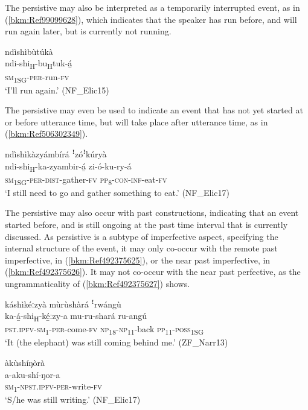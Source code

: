 The persistive may also be interpreted as a temporarily interrupted event, as in (\ref{bkm:Ref99099628}), which indicates that the speaker has run before, and will run again later, but is currently not running.

\ea
\label{bkm:Ref99099628}
\glll ndìshìbùtúkà\\
ndi-shi\textsubscript{H}-bu\textsubscript{H}tuk-á̲\\
\textsc{sm}\textsubscript{1SG}-\textsc{per}-run-\textsc{fv}\\
\glt ‘I’ll run again.’ (NF\_Elic15)
\z

The persistive may even be used to indicate an event that has not yet started at or before utterance time, but will take place after utterance time, as in (\ref{bkm:Ref506302349}).

\ea
\label{bkm:Ref506302349}
ndìshìkàzyámbírá ꜝzóꜝkúryà\\
\gll ndi-shi\textsubscript{H}-ka-zyambir-á̲  zi-ó-ku-ry-á\\
\textsc{sm}\textsubscript{1SG}-\textsc{per}-\textsc{dist}-gather-\textsc{fv}  \textsc{pp}\textsubscript{8}-\textsc{con}-\textsc{inf}-eat\--\textsc{fv}\\
\glt ‘I still need to go and gather something to eat.’ (NF\_Elic17)
\z

The persistive may also occur with past constructions, indicating that an event started before, and is still ongoing at the past time interval that is currently discussed. As persistive is a subtype of imperfective aspect, specifying the internal structure of the event, it may only co-occur with the remote past imperfective, in (\ref{bkm:Ref492375625}), or the near past imperfective, in (\ref{bkm:Ref492375626}). It may not co-occur with the near past perfective, as the ungrammaticality of (\ref{bkm:Ref492375627}) shows.

\ea
\label{bkm:Ref492375625}
káshìkéːzyà mùrùshàrá ꜝrwángù\\
\gll ka-á̲-shi\textsubscript{H}-ké̲ːzy-a      mu-ru-shará    ru-angú\\
\textsc{pst}.\textsc{ipfv}-\textsc{sm}\textsubscript{1}-\textsc{per}-come-\textsc{fv}  \textsc{np}\textsubscript{18}-\textsc{np}\textsubscript{11}-back  \textsc{pp}\textsubscript{11}-\textsc{poss}\textsubscript{1SG}\\
\glt ‘It (the elephant) was still coming behind me.’ (ZF\_Narr13)
\z

\ea
\label{bkm:Ref492375626}
\glll àkùshíŋòrà\\
a-aku-shí-ŋor-a\\
\textsc{sm}\textsubscript{1}-\textsc{npst}.\textsc{ipfv}-\textsc{per}-write-\textsc{fv}\\
\glt ‘S/he was still writing.’ (NF\_Elic17)
\z

